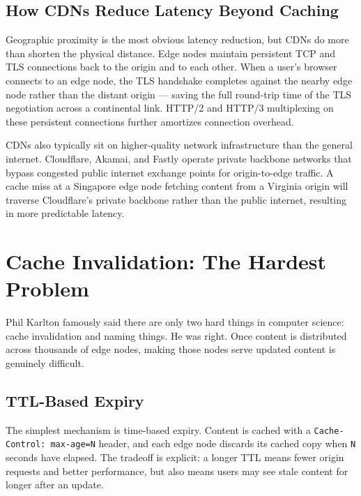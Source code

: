 \documentclass[11pt,a4paper]{article}
\begin{document}
\subsection{How CDNs Reduce Latency Beyond Caching}

Geographic proximity is the most obvious latency reduction, but CDNs do more than shorten the physical distance. Edge nodes maintain persistent TCP and TLS connections back to the origin and to each other. When a user's browser connects to an edge node, the TLS handshake completes against the nearby edge node rather than the distant origin --- saving the full round-trip time of the TLS negotiation across a continental link. HTTP/2 and HTTP/3 multiplexing on these persistent connections further amortizes connection overhead.

CDNs also typically sit on higher-quality network infrastructure than the general internet. Cloudflare, Akamai, and Fastly operate private backbone networks that bypass congested public internet exchange points for origin-to-edge traffic. A cache miss at a Singapore edge node fetching content from a Virginia origin will traverse Cloudflare's private backbone rather than the public internet, resulting in more predictable latency.

\section{Cache Invalidation: The Hardest Problem}

Phil Karlton famously said there are only two hard things in computer science: cache invalidation and naming things. He was right. Once content is distributed across thousands of edge nodes, making those nodes serve updated content is genuinely difficult.

\subsection{TTL-Based Expiry}

The simplest mechanism is time-based expiry. Content is cached with a \texttt{Cache-Control: max-age=N} header, and each edge node discards its cached copy when \texttt{N} seconds have elapsed. The tradeoff is explicit: a longer TTL means fewer origin requests and better performance, but also means users may see stale content for longer after an update.
\end{document}
